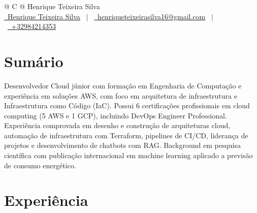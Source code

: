 \documentclass[a4paper,12pt]{article}
\begin{document}
\pagestyle{empty} 



\begin{tabularx}{\linewidth}{@{} C @{}}
\Huge{Henrique Teixeira Silva} \\[7.5pt]
\href{https://www.linkedin.com/in/henrique-teixeira-silva-058446240/}{\raisebox{-0.05\height}\faLinkedin\ Henrique Teixeira Silva} \ $|$ \ 
\href{mailto:henriqueteixeirasilva16@gmail.com}{\raisebox{-0.05\height}\faEnvelope \ henriqueteixeirasilva16@gmail.com} \ $|$ \ 
\href{tel:+32984214353}{\raisebox{-0.05\height}\faMobile \ +32984214353} \\
\end{tabularx}


\section{Sumário}
Desenvolvedor Cloud júnior com formação em Engenharia de Computação e experiência em soluções AWS, com foco em arquitetura de infraestrutura e Infraestrutura como Código (IaC). Possui 6 certificações profissionais em cloud computing (5 AWS e 1 GCP), incluindo DevOps Engineer Professional. Experiência comprovada em desenho e construção de arquiteturas cloud, automação de infraestrutura com Terraform, pipelines de CI/CD, liderança de projetos e desenvolvimento de chatbots com RAG. Background em pesquisa científica com publicação internacional em machine learning aplicado a previsão de consumo energético.

\section{Experiência}
\end{document}
